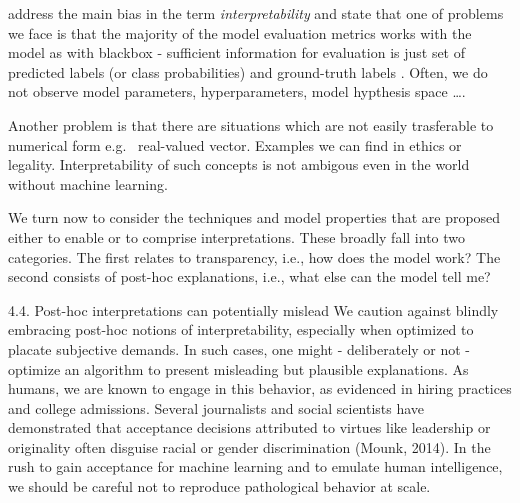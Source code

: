 \citet{Montavon2018} address the main bias in the term \emph{interpretability} and state that one of problems we face is that the majority of the model evaluation metrics works with the model as with blackbox - sufficient information for evaluation is just set of predicted labels (or class probabilities) and ground-truth labels . Often, we do not observe model parameters, hyperparameters, model hypthesis space \dots. 

Another problem is that there are situations which are not easily trasferable to numerical form e.g. \ real-valued vector. Examples we can find in ethics or legality. Interpretability of such concepts is not ambigous even in the world without machine learning.




    We turn now to consider the techniques and model properties that are proposed either to enable or to comprise interpretations. These broadly fall into two categories. The first
    relates to transparency, i.e., how does the model work? The
    second consists of post-hoc explanations, i.e., what else
    can the model tell me? 


    4.4. Post-hoc interpretations can potentially mislead
    We caution against blindly embracing post-hoc notions of
    interpretability, especially when optimized to placate subjective demands. In such cases, one might - deliberately or
    not - optimize an algorithm to present misleading but plausible explanations. As humans, we are known to engage in
    this behavior, as evidenced in hiring practices and college
    admissions. Several journalists and social scientists have
    demonstrated that acceptance decisions attributed to virtues
    like leadership or originality often disguise racial or gender
    discrimination (Mounk, 2014). In the rush to gain acceptance for machine learning and to emulate human intelligence, we should be careful not to reproduce pathological
    behavior at scale.

